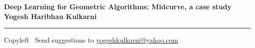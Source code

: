 
\graphicspath{{images/}}

\footnotesize


\begin{center}
\Large{\textbf{Deep Learning for Geometric Algorithms: Midcurve, a case study \\ Yogesh Haribhau Kulkarni}}  
\end{center}

\begin{multicols}{2}

\end{multicols}

\rule{\linewidth}{0.25pt}
\scriptsize
Copyleft \textcopyleft\  Send suggestions to 
\href{http://www.yogeshkulkarni.com}{yogeshkulkarni@yahoo.com}



